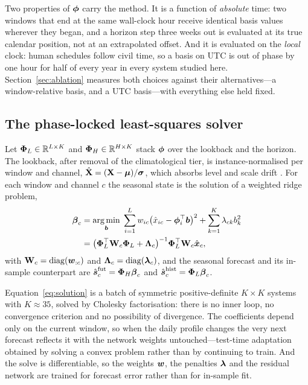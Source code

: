 Two properties of $\boldsymbol{\phi}$ carry the method. It is a function of \emph{absolute} time: two
windows that end at the same wall-clock hour receive identical basis values wherever they
began, and a horizon step three weeks out is evaluated at its true calendar position, not at
an extrapolated offset. And it is evaluated on the \emph{local} clock: human schedules follow
civil time, so a basis on UTC is out of phase by one hour for half of every year in every
system studied here. Section~\ref{sec:ablation} measures both choices against their
alternatives---a window-relative basis, and a UTC basis---with everything else held fixed.

\subsection{The phase-locked least-squares solver}
Let $\boldsymbol{\Phi}_L\in\mathbb{R}^{L\times K}$ and $\boldsymbol{\Phi}_H\in\mathbb{R}^{H\times K}$ stack $\boldsymbol{\phi}$ over
the lookback and the horizon. The lookback, after removal of the climatological tier, is
instance-normalised per window and channel, $\hat{\mathbf{X}}=(\mathbf{X}-\boldsymbol{\mu})/\boldsymbol{\sigma}$,
which absorbs level and scale drift
\cite{kim2022revin}. For each window and channel $c$ the seasonal state is the solution of a
weighted ridge problem,
\begin{equation}
\begin{split}
\boldsymbol{\beta}_c&=\operatorname*{arg\,min}_{\boldsymbol{b}}\;\sum_{i=1}^{L} w_{ic}\bigl(\hat{x}_{ic}-\boldsymbol{\phi}_i^\top\boldsymbol{b}\bigr)^2
+\sum_{k=1}^{K}\lambda_{ck}b_k^2\\
&=\bigl(\boldsymbol{\Phi}_L^\top\mathbf{W}_c\boldsymbol{\Phi}_L+\boldsymbol{\Lambda}_c\bigr)^{-1}\boldsymbol{\Phi}_L^\top\mathbf{W}_c\hat{\boldsymbol{x}}_c,
\end{split}
\label{eq:solution}
\end{equation}
with $\mathbf{W}_c=\operatorname{diag}(\boldsymbol{w}_{:c})$ and $\boldsymbol{\Lambda}_c=\operatorname{diag}(\boldsymbol{\lambda}_c)$,
and the seasonal forecast and its in-sample counterpart are
$\hat{\boldsymbol{s}}^{\text{fut}}_c=\boldsymbol{\Phi}_H\boldsymbol{\beta}_c$ and
$\hat{\boldsymbol{s}}^{\text{hist}}_c=\boldsymbol{\Phi}_L\boldsymbol{\beta}_c$.

Equation~\eqref{eq:solution} is a batch of symmetric positive-definite $K\times K$ systems with
$K\approx 35$, solved by Cholesky factorisation: there is no inner loop, no convergence
criterion and no possibility of divergence. The coefficients depend only on the current
window, so when the daily profile changes the very next forecast reflects it with the network
weights untouched---test-time adaptation obtained by solving a convex problem rather than by
continuing to train. And the solve is differentiable, so the weights $\boldsymbol{w}$, the penalties
$\boldsymbol{\lambda}$ and the residual network are trained for forecast error rather than for
in-sample fit.


